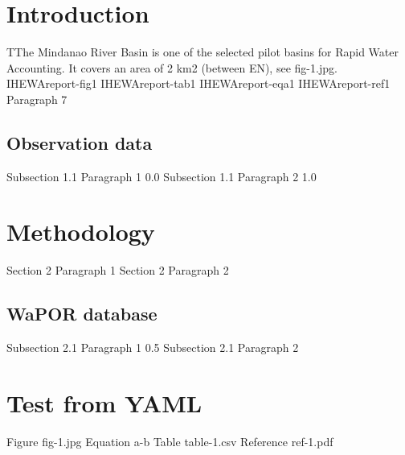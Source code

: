 \documentclass{article}%
\begin{document}
\section{Introduction}%
\label{sec:Introduction}%
TThe Mindanao River Basin is one of the selected pilot basins for Rapid Water Accounting. It covers an area of 2 km2 (between EN), see fig{-}1.jpg.%
\linebreak%
%
\linebreak%
IHEWAreport{-}fig1%
\linebreak%
IHEWAreport{-}tab1%
\linebreak%
IHEWAreport{-}eqa1%
\linebreak%
IHEWAreport{-}ref1%
\linebreak%
Paragraph 7%
\linebreak%
\subsection{Observation data }%
\label{subsec:Observationdata}%
Subsection 1.1 Paragraph 1 0.0%
\linebreak%
Subsection 1.1 Paragraph 2 1.0%
\linebreak

%
\newpage%
\RaggedRight%
\section{Methodology}%
\label{sec:Methodology}%
Section 2 Paragraph 1%
\linebreak%
Section 2 Paragraph 2%
\linebreak%
\subsection{WaPOR database}%
\label{subsec:WaPORdatabase}%
Subsection 2.1 Paragraph 1 0.5%
\linebreak%
Subsection 2.1 Paragraph 2%
\linebreak

%
\newpage%
\RaggedRight%
\section{Test from YAML}%
\label{sec:TestfromYAML}%
Figure fig{-}1.jpg%
\linebreak%
Equation a{-}b%
\linebreak%
Table table{-}1.csv%
\linebreak%
Reference ref{-}1.pdf%
\linebreak
\end{document}

